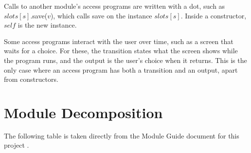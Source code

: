 \documentclass[10pt, titlepage]{article}
\newcommand{\T}[1]{\mathit{#1}}          %
\begin{document}
Calls to another module's access programs are written with a dot, such as
$\T{slots}[s]$.save($v$), which calls save on the instance $\T{slots}[s]$.
Inside a constructor, $\T{self}$ is the new instance.

Some access programs interact with the user over time, such as a screen that
waits for a choice. For these, the transition states what the screen shows
while the program runs, and the output is the user's choice when it returns.
This is the only case where an access program has both a transition and an
output, apart from constructors.

\newpage
\section{Module Decomposition}

The following table is taken directly from the Module Guide document for this project \cite{MG}.
\end{document}
